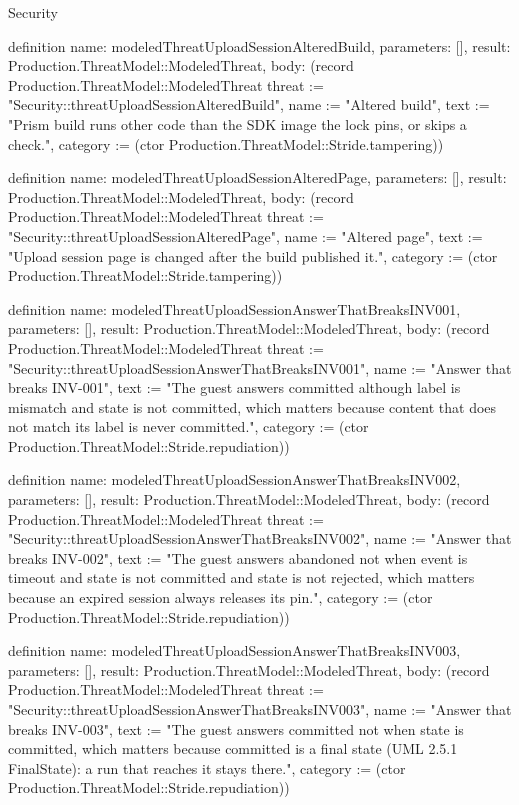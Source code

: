 \begin{lexlean}{Security}
\begin{semanticmodule}
definition{
  name: modeledThreatUploadSessionAlteredBuild,
  parameters: [],
  result: Production.ThreatModel::ModeledThreat,
  body: (record Production.ThreatModel::ModeledThreat {threat := "Security::threatUploadSessionAlteredBuild", name := "Altered build", text := "Prism build runs other code than the SDK image the lock pins, or skips a check.", category := (ctor Production.ThreatModel::Stride.tampering)})
}

definition{
  name: modeledThreatUploadSessionAlteredPage,
  parameters: [],
  result: Production.ThreatModel::ModeledThreat,
  body: (record Production.ThreatModel::ModeledThreat {threat := "Security::threatUploadSessionAlteredPage", name := "Altered page", text := "Upload session page is changed after the build published it.", category := (ctor Production.ThreatModel::Stride.tampering)})
}

definition{
  name: modeledThreatUploadSessionAnswerThatBreaksINV001,
  parameters: [],
  result: Production.ThreatModel::ModeledThreat,
  body: (record Production.ThreatModel::ModeledThreat {threat := "Security::threatUploadSessionAnswerThatBreaksINV001", name := "Answer that breaks INV-001", text := "The guest answers committed although label is mismatch and state is not committed, which matters because content that does not match its label is never committed.", category := (ctor Production.ThreatModel::Stride.repudiation)})
}

definition{
  name: modeledThreatUploadSessionAnswerThatBreaksINV002,
  parameters: [],
  result: Production.ThreatModel::ModeledThreat,
  body: (record Production.ThreatModel::ModeledThreat {threat := "Security::threatUploadSessionAnswerThatBreaksINV002", name := "Answer that breaks INV-002", text := "The guest answers abandoned not when event is timeout and state is not committed and state is not rejected, which matters because an expired session always releases its pin.", category := (ctor Production.ThreatModel::Stride.repudiation)})
}

definition{
  name: modeledThreatUploadSessionAnswerThatBreaksINV003,
  parameters: [],
  result: Production.ThreatModel::ModeledThreat,
  body: (record Production.ThreatModel::ModeledThreat {threat := "Security::threatUploadSessionAnswerThatBreaksINV003", name := "Answer that breaks INV-003", text := "The guest answers committed not when state is committed, which matters because committed is a final state (UML 2.5.1 FinalState): a run that reaches it stays there.", category := (ctor Production.ThreatModel::Stride.repudiation)})
}


\end{semanticmodule}
\end{lexlean}
